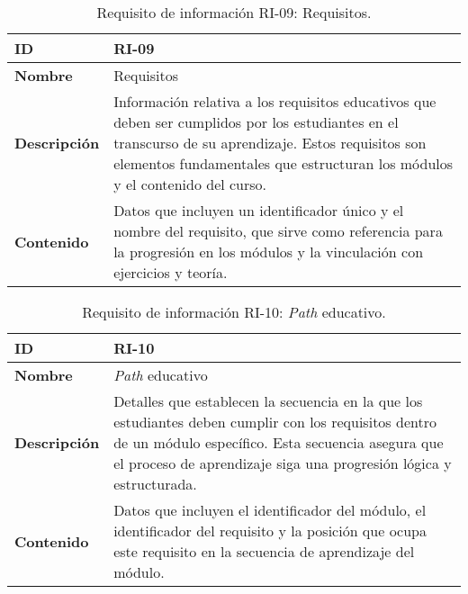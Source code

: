 \begin{table}[H]
    \centering
    \begin{tabular}{|l|p{9.5cm}|}
        \hline
        \textbf{ID} & RI-09 \\
        \hline
        \textbf{Nombre} & Requisitos \\
        \hline
        \textbf{Descripción} & Información relativa a los requisitos educativos que deben ser cumplidos por los estudiantes en el transcurso de su aprendizaje. Estos requisitos son elementos fundamentales que estructuran los módulos y el contenido del curso.  \\
        \hline
        \textbf{Contenido} & Datos que incluyen un identificador único y el nombre del requisito, que sirve como referencia para la progresión en los módulos y la vinculación con ejercicios y teoría. \\
        \hline
    \end{tabular}
    \caption{Requisito de información RI-09: Requisitos.}
    \label{table:req-RI11}
\end{table}

\begin{table}[H]
    \centering
    \begin{tabular}{|l|p{9.5cm}|}
        \hline
        \textbf{ID} & RI-10 \\
        \hline
        \textbf{Nombre} & \textit{Path} educativo \\
        \hline
        \textbf{Descripción} & Detalles que establecen la secuencia en la que los estudiantes deben cumplir con los requisitos dentro de un módulo específico. Esta secuencia asegura que el proceso de aprendizaje siga una progresión lógica y estructurada.  \\
        \hline
        \textbf{Contenido} & Datos que incluyen el identificador del módulo, el identificador del requisito y la posición que ocupa este requisito en la secuencia de aprendizaje del módulo. \\
        \hline
    \end{tabular}
    \caption{Requisito de información RI-10: \textit{Path} educativo.}
    \label{table:req-RI12}
\end{table}


